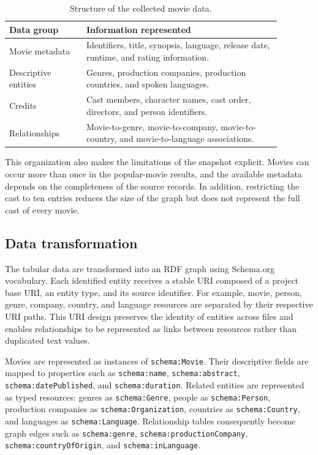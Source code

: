 \begin{table}[t]
    \centering
    \caption{Structure of the collected movie data.}
    \label{tab:tmdb-data-structure}
    \small
    \begin{tabular}{p{0.25\linewidth}p{0.63\linewidth}}
        \toprule
        \textbf{Data group} & \textbf{Information represented} \\
        \midrule
        Movie metadata &
        Identifiers, title, synopsis, language, release date, runtime, and
        rating information. \\
        Descriptive entities &
        Genres, production companies, production countries, and spoken
        languages. \\
        Credits &
        Cast members, character names, cast order, directors, and person
        identifiers. \\
        Relationships &
        Movie-to-genre, movie-to-company, movie-to-country, and
        movie-to-language associations. \\
        \bottomrule
    \end{tabular}
\end{table}

This organization also makes the limitations of the snapshot explicit.
Movies can occur more than once in the popular-movie results, and the
available metadata depends on the completeness of the source records. In
addition, restricting the cast to ten entries reduces the size of the graph
but does not represent the full cast of every movie.

\subsection{Data transformation}

The tabular data are transformed into an RDF graph using Schema.org
vocabulary. Each identified entity receives a stable URI composed of a
project base URI, an entity type, and its source identifier. For example,
movie, person, genre, company, country, and language resources are separated
by their respective URI paths. This URI design preserves the identity of
entities across files and enables relationships to be represented as links
between resources rather than duplicated text values.

Movies are represented as instances of \texttt{schema:Movie}. Their
descriptive fields are mapped to properties such as
\texttt{schema:name}, \texttt{schema:abstract},
\texttt{schema:datePublished}, and \texttt{schema:duration}. Related
entities are represented as typed resources: genres as
\texttt{schema:Genre}, people as \texttt{schema:Person}, production
companies as \texttt{schema:Organization}, countries as
\texttt{schema:Country}, and languages as \texttt{schema:Language}.
Relationship tables consequently become graph edges such as
\texttt{schema:genre}, \texttt{schema:productionCompany},
\texttt{schema:countryOfOrigin}, and \texttt{schema:inLanguage}.

